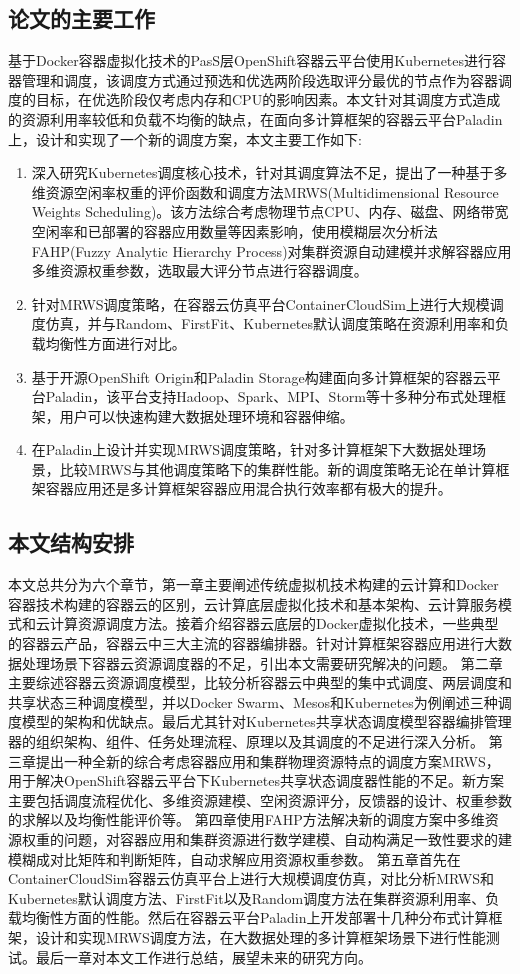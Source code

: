 \subsection{论文的主要工作}
基于Docker容器虚拟化技术的PasS层OpenShift容器云平台使用Kubernetes进行容器管理和调度，该调度方式通过预选和优选两阶段选取评分最优的节点作为容器调度的目标，在优选阶段仅考虑内存和CPU的影响因素。本文针对其调度方式造成的资源利用率较低和负载不均衡的缺点，在面向多计算框架的容器云平台Paladin上，设计和实现了一个新的调度方案，本文主要工作如下:
 \begin{enumerate}[(1)]
\item 深入研究Kubernetes调度核心技术，针对其调度算法不足，提出了一种基于多维资源空闲率权重的评价函数和调度方法MRWS(Multidimensional Resource Weights Scheduling)。该方法综合考虑物理节点CPU、内存、磁盘、网络带宽空闲率和已部署的容器应用数量等因素影响，使用模糊层次分析法FAHP(Fuzzy Analytic Hierarchy Process)对集群资源自动建模并求解容器应用多维资源权重参数，选取最大评分节点进行容器调度。
\item 针对MRWS调度策略，在容器云仿真平台ContainerCloudSim上进行大规模调度仿真，并与Random、FirstFit、Kubernetes默认调度策略在资源利用率和负载均衡性方面进行对比。
\item 基于开源OpenShift Origin和Paladin Storage构建面向多计算框架的容器云平台Paladin，该平台支持Hadoop、Spark、MPI、Storm等十多种分布式处理框架，用户可以快速构建大数据处理环境和容器伸缩。
\item 在Paladin上设计并实现MRWS调度策略，针对多计算框架下大数据处理场景，比较MRWS与其他调度策略下的集群性能。新的调度策略无论在单计算框架容器应用还是多计算框架容器应用混合执行效率都有极大的提升。
\end{enumerate}

\subsection{本文结构安排}
本文总共分为六个章节，第一章主要阐述传统虚拟机技术构建的云计算和Docker容器技术构建的容器云的区别，云计算底层虚拟化技术和基本架构、云计算服务模式和云计算资源调度方法。接着介绍容器云底层的Docker虚拟化技术，一些典型的容器云产品，容器云中三大主流的容器编排器。针对计算框架容器应用进行大数据处理场景下容器云资源调度器的不足，引出本文需要研究解决的问题。
第二章主要综述容器云资源调度模型，比较分析容器云中典型的集中式调度、两层调度和共享状态三种调度模型，并以Docker Swarm、Mesos和Kubernetes为例阐述三种调度模型的架构和优缺点。最后尤其针对Kubernetes共享状态调度模型容器编排管理器的组织架构、组件、任务处理流程、原理以及其调度的不足进行深入分析。
第三章提出一种全新的综合考虑容器应用和集群物理资源特点的调度方案MRWS，用于解决OpenShift容器云平台下Kubernetes共享状态调度器性能的不足。新方案主要包括调度流程优化、多维资源建模、空闲资源评分，反馈器的设计、权重参数的求解以及均衡性能评价等。
第四章使用FAHP方法解决新的调度方案中多维资源权重的问题，对容器应用和集群资源进行数学建模、自动构满足一致性要求的建模糊成对比矩阵和判断矩阵，自动求解应用资源权重参数。
第五章首先在ContainerCloudSim容器云仿真平台上进行大规模调度仿真，对比分析MRWS和Kubernetes默认调度方法、FirstFit以及Random调度方法在集群资源利用率、负载均衡性方面的性能。然后在容器云平台Paladin上开发部署十几种分布式计算框架，设计和实现MRWS调度方法，在大数据处理的多计算框架场景下进行性能测试。最后一章对本文工作进行总结，展望未来的研究方向。

